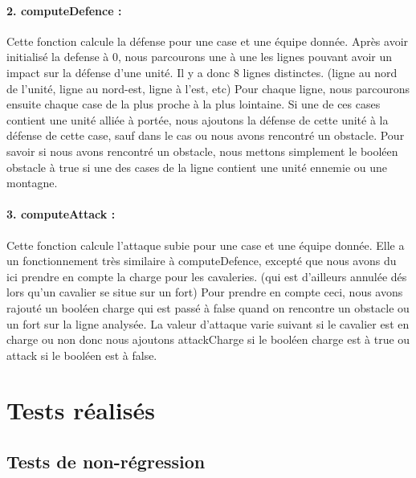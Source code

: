 			\paragraph{2. computeDefence : }
			Cette fonction calcule la défense pour une case et une équipe donnée.
			Après avoir initialisé la defense à 0, nous parcourons une à une les lignes pouvant avoir un impact sur la défense d'une unité.
			Il y a donc 8 lignes distinctes. (ligne au nord de l'unité, ligne au nord-est, ligne à l'est, etc)
			Pour chaque ligne, nous parcourons ensuite chaque case de la plus proche à la plus lointaine.
			Si une de ces cases contient une unité alliée à portée, nous ajoutons la défense de cette unité à la défense de cette case, 
			sauf dans le cas ou nous avons rencontré un obstacle.
			Pour savoir si nous avons rencontré un obstacle, nous mettons simplement le booléen obstacle à true si une des cases de la 
			ligne contient une unité ennemie ou une montagne.
			
			\paragraph{3. computeAttack : }
			Cette fonction calcule l'attaque subie pour une case et une équipe donnée.
			Elle a un fonctionnement très similaire à computeDefence, excepté que nous avons du ici prendre en compte la charge pour les cavaleries. 
			(qui est d'ailleurs annulée dés lors qu'un cavalier se situe sur un fort)
			Pour prendre en compte ceci, nous avons rajouté un booléen charge qui est passé à false quand on rencontre un obstacle 
			ou un fort sur la ligne analysée.
			La valeur d'attaque varie suivant si le cavalier est en charge ou non donc nous ajoutons attackCharge si le booléen charge est 
			à true ou attack si le booléen est à false.
			
		\clearpage
	 

	\section{Tests réalisés}

		\subsection{Tests de non-régression}
		
